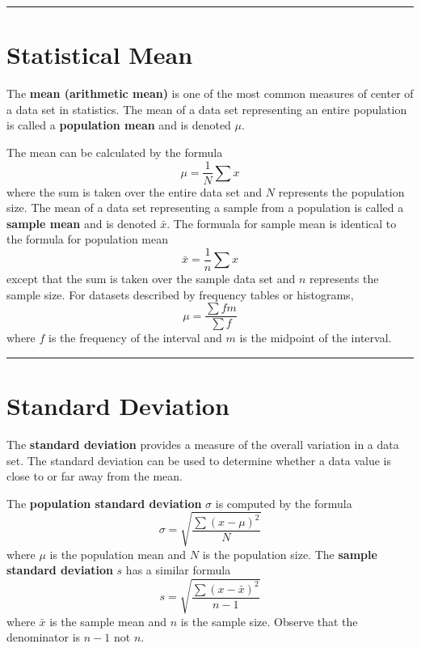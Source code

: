 \documentclass{article}
\theoremstyle{definition}
\newcommand{\secend}[0]{\noindent\rule[0.5ex]{\linewidth}{1pt}}
\begin{document}
\secend

\section{Statistical Mean}
\begin{definition}
    The \textbf{mean (arithmetic mean)} is one of the most common measures of 
    center of a data set in statistics. The mean of a data set representing an 
    entire population is called a \textbf{population mean} and is denoted $\mu$. 
\end{definition}

\noindent The mean can be calculated by the formula 
\[
    \mu = \frac{1}{N}\sum x
\]
where the sum is taken over the entire data set and $N$ represents the
population size. The mean of a data set representing a sample from a population 
is called a \textbf{sample mean} and is denoted $\bar{x}$. The formuala for 
sample mean is identical to the formula for population mean 
\[
    \bar{x} = \frac{1}{n}\sum x
\]
except that the sum is taken over the sample data set and $n$ represents the
sample size. For datasets described by frequency tables or histograms, 
\[
    \mu = \frac{\sum f m}{\sum f}
\]
where $f$ is the frequency of the interval and $m$ is the midpoint of the
interval.

\secend

\section{Standard Deviation}
\begin{definition}
    The \textbf{standard deviation} provides a measure of the overall variation
    in a data set. The standard deviation can be used to determine whether a
    data value is close to or far away from the mean.
\end{definition}

\noindent The \textbf{population standard deviation} $\sigma$ is computed by the
formula
\[
    \sigma = \sqrt{\frac{\sum(x-\mu)^2}{N}}
\]
where $\mu$ is the population mean and $N$ is the population size. The
\textbf{sample standard deviation} $s$ has a similar formula 
\[
    s = \sqrt{\frac{\sum(x-\bar{x})^2}{n-1}}
\]
where $\bar{x}$ is the sample mean and $n$ is the sample size. Observe that the
denominator is $n-1$ not $n$. 
\end{document}
